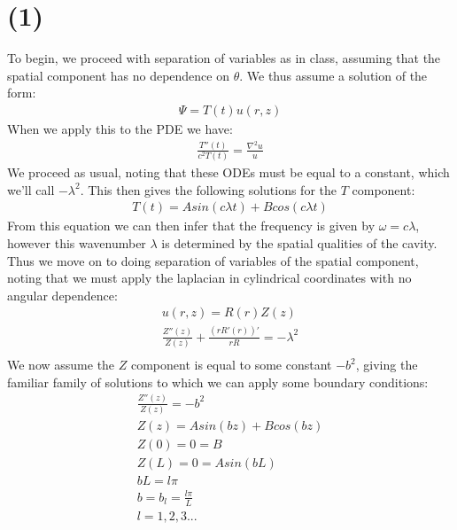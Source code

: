 \documentclass{article}
\begin{document}
\section*{\textbf{(1)}}
To begin, we proceed with separation of variables as in class, assuming that the spatial component has no dependence on $\theta$. We thus assume a solution of the form:
\begin{equation}
\begin{aligned}
\Psi = T(t)u(r,z)
\end{aligned}
\end{equation}
When we apply this to the PDE we have:
\begin{equation}
\begin{aligned}
\frac{T''(t)}{c^2T(t)} = \frac{\nabla^2u}{u}
\end{aligned}
\end{equation}
We proceed as usual, noting that these ODEs must be equal to a constant, which we'll call $-\lambda^2$. This then gives the following solutions for the $T$ component:
\begin{equation}
\begin{aligned}
T(t) = Asin(c\lambda t) + Bcos(c\lambda t)
\end{aligned}
\end{equation}
From this equation we can then infer that the frequency is given by $\omega = c\lambda$, however this wavenumber $\lambda$ is determined by the spatial qualities of the cavity. Thus we move on to doing separation of variables of the spatial component, noting that we must apply the laplacian in cylindrical coordinates with no angular dependence:
\begin{equation}
\begin{aligned}
u(r,z) = R(r)Z(z)\\
\frac{Z''(z)}{Z(z)} + \frac{(rR'(r))'}{rR} = -\lambda^2\\ 
\end{aligned}
\end{equation}
We now assume the $Z$ component is equal to some constant $-b^2$, giving the familiar family of solutions to which we can apply some boundary conditions:
\begin{equation}
\begin{aligned}
\frac{Z''(z)}{Z(z)} = -b^2\\
Z(z) = Asin(bz) + Bcos(bz)\\
Z(0) = 0 = B\\
Z(L) = 0 = Asin(bL)\\
bL = l\pi\\
b = b_l = \frac{l\pi}{L}\\
l = 1,2,3...
\end{aligned}
\end{equation}
\end{document}
